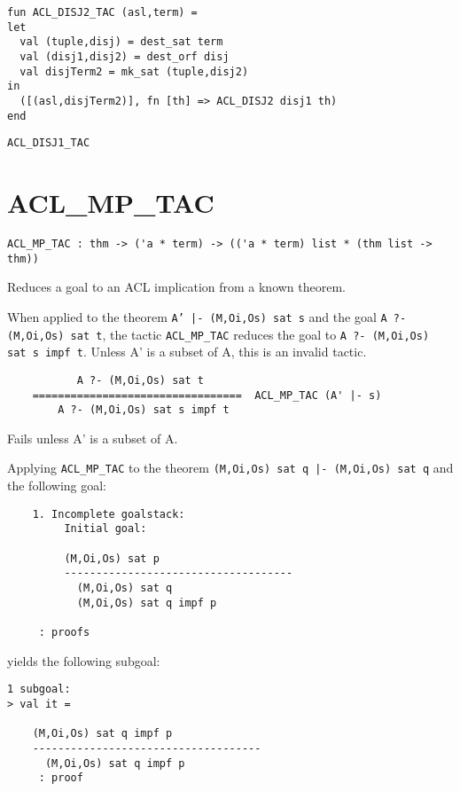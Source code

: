 \IMPLEMENTATION
\begin{holboxed}
\begin{verbatim}
fun ACL_DISJ2_TAC (asl,term) =
let
  val (tuple,disj) = dest_sat term
  val (disj1,disj2) = dest_orf disj
  val disjTerm2 = mk_sat (tuple,disj2)
in
  ([(asl,disjTerm2)], fn [th] => ACL_DISJ2 disj1 th)
end
\end{verbatim}
\end{holboxed}

\SEEALSO
\texttt{ACL\_DISJ1\_TAC}
\ENDDOC

\section{ACL\_MP\_TAC}



\small{
\begin{lstlisting}[breaklines]
ACL_MP_TAC : thm -> ('a * term) -> (('a * term) list * (thm list -> thm))
\end{lstlisting}}\egroup


\SYNOPSIS
Reduces a goal to an ACL implication from a known theorem.

\DESCRIBE When applied to the theorem \texttt{A' |- (M,Oi,Os) sat s} and the goal \texttt{A ?- (M,Oi,Os) sat t}, the tactic \texttt{ACL\_MP\_TAC} reduces the goal to \texttt{A ?- (M,Oi,Os) sat s impf t}. Unless A' is a subset of A, this is an invalid tactic.
\begin{verbatim}
           A ?- (M,Oi,Os) sat t
    =================================  ACL_MP_TAC (A' |- s)
        A ?- (M,Oi,Os) sat s impf t
\end{verbatim}

\FAILURE 
Fails unless A' is a subset of A.

\EXAMPLE
Applying \texttt{ACL\_MP\_TAC} to the theorem \texttt{(M,Oi,Os) sat q |- (M,Oi,Os) sat q} and the following goal:
\begin{holboxed}
\begin{verbatim}
    1. Incomplete goalstack:
         Initial goal:
    
         (M,Oi,Os) sat p
         ------------------------------------
           (M,Oi,Os) sat q
           (M,Oi,Os) sat q impf p
    
     : proofs
\end{verbatim}
\end{holboxed}
yields the following subgoal:
\begin{holboxed}
\begin{verbatim}
1 subgoal:
> val it =
    
    (M,Oi,Os) sat q impf p
    ------------------------------------
      (M,Oi,Os) sat q impf p
     : proof
\end{verbatim}
\end{holboxed}

